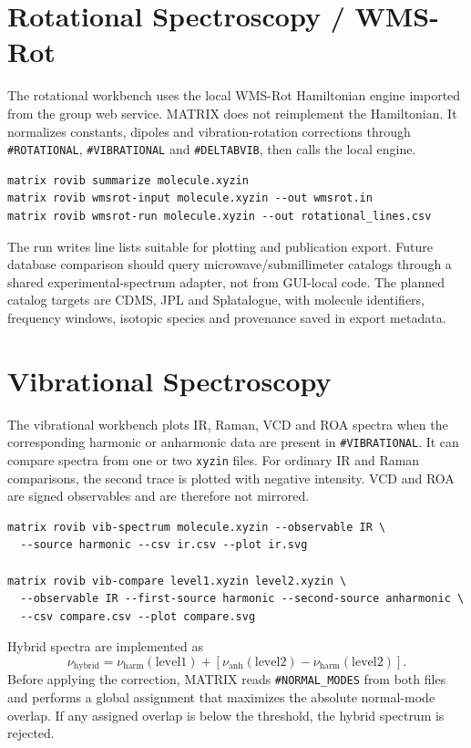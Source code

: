 \documentclass[11pt]{article}
\newcommand{\xyzin}{\texttt{xyzin}}
\newcommand{\sectionname}[1]{\texttt{\##1}}
\begin{document}
\section{Rotational Spectroscopy / WMS-Rot}

The rotational workbench uses the local WMS-Rot Hamiltonian engine imported
from the group web service.  MATRIX does not reimplement the Hamiltonian.  It
normalizes constants, dipoles and vibration-rotation corrections through
\sectionname{ROTATIONAL}, \sectionname{VIBRATIONAL} and
\sectionname{DELTABVIB}, then calls the local engine.

\begin{lstlisting}[style=matrix]
matrix rovib summarize molecule.xyzin
matrix rovib wmsrot-input molecule.xyzin --out wmsrot.in
matrix rovib wmsrot-run molecule.xyzin --out rotational_lines.csv
\end{lstlisting}

The run writes line lists suitable for plotting and publication export.  Future
database comparison should query microwave/submillimeter catalogs through a
shared experimental-spectrum adapter, not from GUI-local code.  The planned
catalog targets are CDMS, JPL and Splatalogue, with molecule identifiers,
frequency windows, isotopic species and provenance saved in export metadata.

\section{Vibrational Spectroscopy}

The vibrational workbench plots IR, Raman, VCD and ROA spectra when the
corresponding harmonic or anharmonic data are present in
\sectionname{VIBRATIONAL}.  It can compare spectra from one or two \xyzin{}
files.  For ordinary IR and Raman comparisons, the second trace is plotted with
negative intensity.  VCD and ROA are signed observables and are therefore not
mirrored.

\begin{lstlisting}[style=matrix]
matrix rovib vib-spectrum molecule.xyzin --observable IR \
  --source harmonic --csv ir.csv --plot ir.svg

matrix rovib vib-compare level1.xyzin level2.xyzin \
  --observable IR --first-source harmonic --second-source anharmonic \
  --csv compare.csv --plot compare.svg
\end{lstlisting}

Hybrid spectra are implemented as
\[
  \nu_\mathrm{hybrid}
  =
  \nu_\mathrm{harm}(\mathrm{level1})
  +
  \left[
    \nu_\mathrm{anh}(\mathrm{level2})
    -
    \nu_\mathrm{harm}(\mathrm{level2})
  \right].
\]
Before applying the correction, MATRIX reads \sectionname{NORMAL\_MODES} from
both files and performs a global assignment that maximizes the absolute
normal-mode overlap.  If any assigned overlap is below the threshold, the
hybrid spectrum is rejected.
\end{document}
